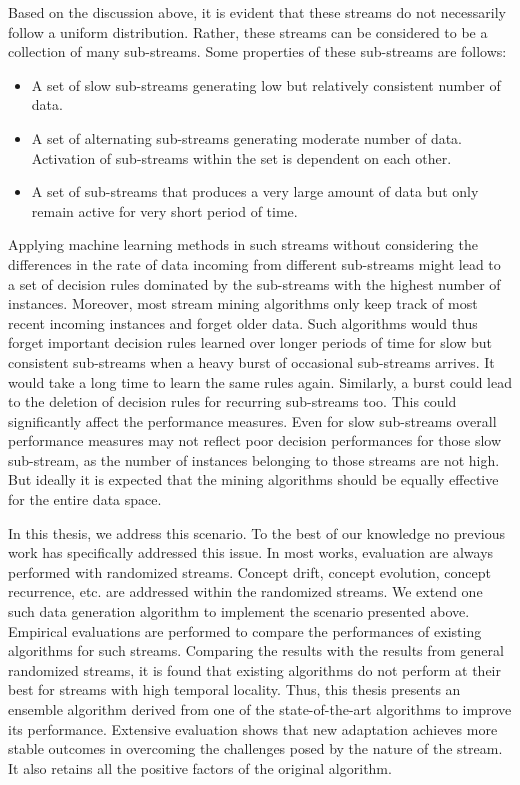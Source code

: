 Based on the discussion above, it is evident that these streams do not necessarily follow a uniform distribution. Rather, these streams can be considered to be a collection of many sub-streams. Some properties of these sub-streams are follows:
\begin{itemize}
    \item A set of slow sub-streams generating low but relatively consistent number of data.
    \item A set of alternating sub-streams generating moderate number of data. Activation of sub-streams within the set is dependent on each other.
    \item A set of sub-streams that produces a very large amount of data but only remain active for very short period of time.
\end{itemize}

Applying machine learning methods in such streams without considering the differences in the rate of data incoming from different sub-streams might lead to a set of decision rules dominated by the sub-streams with the highest number of instances. Moreover, most stream mining algorithms only keep track of most recent incoming instances and forget older data. Such algorithms would thus forget important decision rules learned over longer periods of time for slow but consistent sub-streams when a heavy burst of occasional sub-streams arrives. It would take a long time to learn the same rules again. Similarly, a burst could lead to the deletion of decision rules for recurring sub-streams too. This could significantly affect the performance measures. Even for slow sub-streams overall performance measures may not reflect poor decision performances for those slow sub-stream, as the number of instances belonging to those streams are not high. But ideally it is expected that the mining algorithms should be equally effective for the entire data space.

In this thesis, we address this scenario. To the best of our knowledge no previous work has specifically addressed this issue. In most works, evaluation are always performed with randomized streams. Concept drift, concept evolution, concept recurrence, etc. are addressed within the randomized streams. We extend one such data generation algorithm to implement the scenario presented above. Empirical evaluations are performed to compare the performances of existing algorithms for such streams. Comparing the results with the results from general randomized streams, it is found that existing algorithms do not perform at their best for streams with high temporal locality. Thus, this thesis presents an ensemble algorithm derived from one of the state-of-the-art algorithms to improve its performance. Extensive evaluation shows that new adaptation achieves more stable outcomes in overcoming the challenges posed by the nature of the stream. It also retains all the positive factors of the original algorithm.

